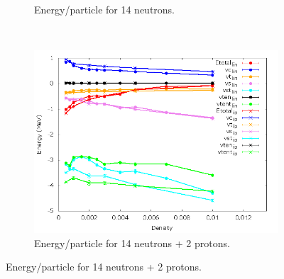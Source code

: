 \documentclass[12pt]{article}
\begin{document}
\begin{figure}[h!]
\begin{subfigure}{0.49\textwidth}
      \caption{Energy/particle for 14 neutrons.}
   \end{subfigure}
   ~
   \begin{subfigure}{0.49\textwidth}
      \includegraphics[width=\textwidth]{../av6_14n2p_linVSip.png}
      \caption{Energy/particle for 14 neutrons + 2 protons.}
   \end{subfigure}
\end{figure}
\newpage
\end{document}
